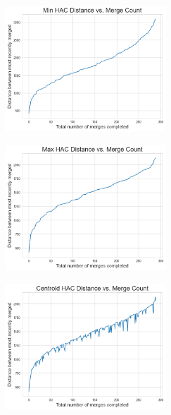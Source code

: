 \documentclass[submit]{harvardml}
\begin{document}
\begin{enumerate}
    \begin{figure}[H]
        \includegraphics[width=6cm]{hw4/img/p2_6a.png}
        \centering
    \end{figure}
    \begin{figure}[H]
        \includegraphics[width=6cm]{hw4/img/p2_6b.png}
        \centering
    \end{figure}
    \begin{figure}[H]
        \includegraphics[width=6cm]{hw4/img/p2_6c.png}
        \centering
    \end{figure}
    
    
    
\end{enumerate}
\end{document}
